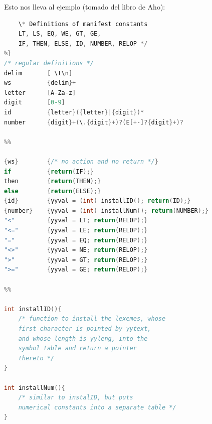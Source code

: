 Esto nos lleva al ejemplo (tomado del libro de Aho):
\begin{lstlisting}[language=C]
%{
    \* Definitions of manifest constants
    LT, LS, EQ, WE, GT, GE,
    IF, THEN, ELSE, ID, NUMBER, RELOP */
%}
/* regular definitions */
delim       [ \t\n]
ws          {delim}+
letter      [A-Za-z]
digit       [0-9]
id          {letter}({letter}|{digit})*
number      {digit}+(\.{digit}+)?(E[+-]?{digit}+)?

%%

{ws}        {/* no action and no return */}
if          {return(IF);}
then        {return(THEN);}
else        {return(ELSE);}
{id}        {yyval = (int) installID(); return(ID);}
{number}    {yyval = (int) installNum(); return(NUMBER);}
"<"         {yyval = LT; return(RELOP);}
"<="        {yyval = LE; return(RELOP);}
"="         {yyval = EQ; return(RELOP);}
"<>"        {yyval = NE; return(RELOP);}
">"         {yyval = GT; return(RELOP);}
">="        {yyval = GE; return(RELOP);}

%%

int installID(){
    /* function to install the lexemes, whose
    first character is pointed by yytext,
    and whose length is yyleng, into the
    symbol table and return a pointer 
    thereto */
}

int installNum(){
    /* similar to instalID, but puts
    numerical constants into a separate table */
}

\end{lstlisting}



